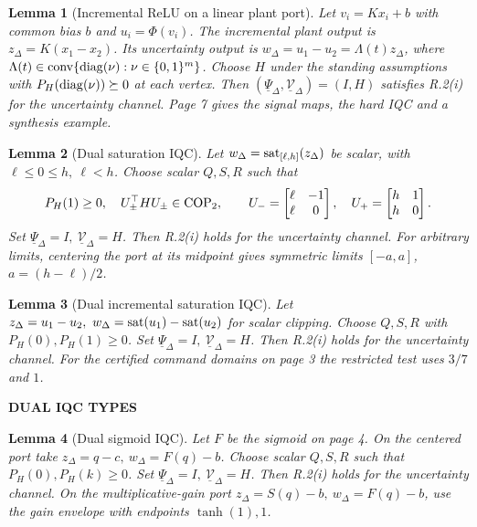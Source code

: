 \documentclass[11pt,a4paper]{article}
\newcommand{\topic}[2]{{\color{accent}\small\bfseries #1}\par\vspace{1mm}{\color{ink}\LARGE\bfseries #2}\par\vspace{2mm}}
\newtheorem{lema}{Lemma}
\begin{document}
\begin{lema}[Incremental ReLU on a linear plant port]
Let \(v_i=Kx_i+b\) with common bias \(b\) and \(u_i=\Phi(v_i)\). The incremental plant output is \(z_\Delta=K(x_1-x_2)\). Its uncertainty output is \(w_\Delta=u_1-u_2=\Lambda(t)z_\Delta\), where \(\Lambda(t)\in\operatorname{conv}\{\operatorname{diag}(\nu):\nu\in\{0,1\}^m\}\).
Choose \(H\) under the standing assumptions with \(P_H(\operatorname{diag}(\nu))\succeq0\) at each vertex. Then \((\underline\Psi_\Delta,\underline{\mathcal V}_\Delta)=(I,H)\) satisfies R.2(i) for the uncertainty channel. Page 7 gives the signal maps, the hard IQC and a synthesis example.
\end{lema}

\begin{lema}[Dual saturation IQC]
Let \(w_\Delta=\operatorname{sat}_{[\ell,h]}(z_\Delta)\) be scalar, with \(\ell\le0\le h,\ \ell<h\). Choose scalar \(Q,S,R\) such that
\[
 P_H(1)\ge0,\quad U_\pm^\top H U_\pm\in\mathrm{COP}_2,\qquad
 U_-=\begin{bmatrix}\ell&-1\\\ell&0\end{bmatrix},\quad
 U_+=\begin{bmatrix}h&1\\h&0\end{bmatrix}.
\]
Set \(\underline\Psi_\Delta=I,\ \underline{\mathcal V}_\Delta=H\). Then R.2(i) holds for the uncertainty channel. For arbitrary limits, centering the port at its midpoint gives symmetric limits \([-a,a]\), \(a=(h-\ell)/2\).
\end{lema}

\begin{lema}[Dual incremental saturation IQC]
Let \(z_\Delta=u_1-u_2,\ w_\Delta=\sat(u_1)-\sat(u_2)\) for scalar clipping. Choose \(Q,S,R\) with \(P_H(0),P_H(1)\ge0\). Set \(\underline\Psi_\Delta=I,\ \underline{\mathcal V}_\Delta=H\). Then R.2(i) holds for the uncertainty channel. For the certified command domains on page 3 the restricted test uses \(3/7\) and \(1\).
\end{lema}
\newpage
\topic{DUAL IQC TYPES}{Plant-side IQCs for sigmoids}
\begin{lema}[Dual sigmoid IQC]
Let \(F\) be the sigmoid on page 4. On the centered port take \(z_\Delta=q-c,\ w_\Delta=F(q)-b\). Choose scalar \(Q,S,R\) such that \(P_H(0),P_H(k)\ge0\). Set \(\underline\Psi_\Delta=I,\ \underline{\mathcal V}_\Delta=H\). Then R.2(i) holds for the uncertainty channel. On the multiplicative-gain port \(z_\Delta=S(q)-b,\ w_\Delta=F(q)-b\), use the gain envelope with endpoints \(\tanh(1),1\).
\end{lema}
\end{document}
